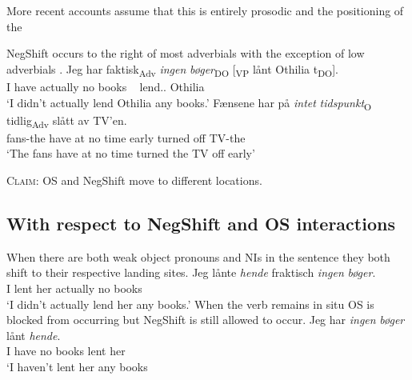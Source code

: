 \documentclass[12pt, letterpaper]{article}
\newcommand{\sub}[1]{\textsubscript{#1}}
\begin{document}
More recent accounts assume that this is entirely prosodic and the positioning of the 

\ea NegShift occurs to the right of most adverbials with the exception of low adverbials \citep{nilsenAdverbsAshift1997,svenoniusStrainsNegationNorwegian2002}.
	\ea 
	\gll Jeg har faktisk\sub{Adv} \emph{ingen} \emph{bøger}\sub{DO} [\sub{VP} lånt Othilia t\sub{DO}].\\
	I have actually no books ~ lend.\Pst{}.\Ptcp{} Othilia \\
	\glt `I didn't actually lend Othilia any books.'
	\ex 
	\gll Fænsene har på \emph{intet} \emph{tidspunkt}\sub{O} tidlig\sub{Adv} slått av TV’en.\\
	fans-the have at no time early turned off TV-the\\
	\glt `The fans have at no time turned the TV off early'
	\z 
\z

\begin{tcolorbox}[width=\linewidth]
\textsc{Claim}: OS and NegShift move to different locations.
\end{tcolorbox}

\subsection{With respect to NegShift and OS interactions} \label{sec:INTERACTION}

\ea When there are both weak object pronouns and NIs in the sentence they both shift to their respective landing sites. 
	\ea
	\gll Jeg lånte \textit{hende} fraktisch \textit{ingen} \textit{bøger}.\\
	I lent her actually no books\\
	\glt `I didn't actually lend her any books.'
	\z 
\ex When the verb remains in situ OS is blocked from occurring but NegShift is still allowed to occur. 
	\ea 
	\gll Jeg har \emph{ingen} \emph{bøger} lånt \emph{hende}.\\
	I have no books lent her\\
	\glt `I haven't lent her any books
	\z
\z
\end{document}

